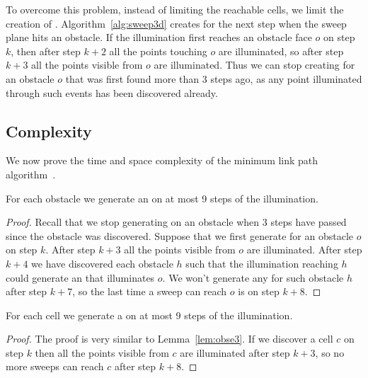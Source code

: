 \documentclass[english,gradu]{tktltiki2018}
\begin{document}
To overcome this problem, instead of limiting the reachable cells, we limit the creation of \addEs.
Algorithm~\ref{alg:sweep3d} creates \addEs for the next step when the sweep plane hits an obstacle.
If the illumination first reaches an obstacle face $o$ on step $k$, then after step $k+2$ all the points touching $o$ are illuminated, so after step $k+3$ all the points visible from $o$ are illuminated.
Thus we can stop creating \addEs for an obstacle $o$ that was first found more than 3 steps ago, as any point illuminated through such events has been discovered already.

\subsection{Complexity}

We now prove the time and space complexity of the minimum link path algorithm~\cite{restricted}.

\begin{lem}\label{lem:obse3}For each obstacle we generate an \obsE on at most 9 steps of the illumination.\end{lem}
\begin{proof}
Recall that we stop generating \addEs on an obstacle when 3 steps have passed since the obstacle was discovered.
Suppose that we first generate \obsE for an obstacle $o$ on step $k$.
After step $k+3$ all the points visible from $o$ are illuminated.
After step $k+4$ we have discovered each obstacle $h$ such that the illumination reaching $h$ could generate an \addE that illuminates $o$.
We won't generate any \addEs for such obstacle $h$ after step $k+7$, so the last time a sweep can reach $o$ is on step $k+8$.
\end{proof}

\begin{lem}\label{lem:celle3}For each cell we generate a \cellE on at most 9 steps of the illumination.\end{lem}
\begin{proof}
The proof is very similar to Lemma~\ref{lem:obse3}.
If we discover a cell $c$ on step $k$ then all the points visible from $c$ are illuminated after step $k+3$, so no more sweeps can reach $c$ after step $k+8$.
\end{proof}
\end{document}
